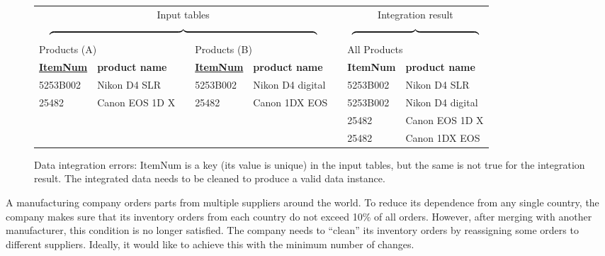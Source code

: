 \begin{figure}
	\small{\begin{tabular}{|l|l|l|l|l|l|l|l|}
		\multicolumn{5}{c}{Input tables} & \multicolumn{1}{l}{}& \multicolumn{2}{c}{Integration result}\\
		\multicolumn{5}{c}{$\overbrace{\rule{9.5cm}{0pt}}$} & \multicolumn{1}{l}{}& \multicolumn{2}{c}{$\overbrace{\rule{4.5cm}{0pt}}$}\\
		\multicolumn{2}{l}{Products (A)} & \multicolumn{1}{l}{} & \multicolumn{2}{l}{Products (B)} & \multicolumn{1}{l}{} & \multicolumn{2}{l}{All Products}\\
		\cline{1-2}\cline{4-5}\cline{7-8}
		\textbf{\underline{ItemNum}} & \textbf{product name} & \multicolumn{1}{l|}{} & \textbf{\underline{ItemNum}} & \textbf{product name} & \multicolumn{1}{l|}{} & \textbf{ItemNum} & \textbf{product name}\\
		\cline{1-2}\cline{4-5}\cline{7-8}
		5253B002 & Nikon D4 SLR & \multicolumn{1}{l|}{} & 5253B002 & Nikon D4 digital & \multicolumn{1}{l|}{} & 5253B002 & Nikon D4 SLR\\
		\cline{1-2}\cline{4-5}\cline{7-8}
		25482 & Canon EOS 1D X & \multicolumn{1}{l|}{} & 25482 & Canon 1DX EOS & \multicolumn{1}{l|}{} & 5253B002 & Nikon D4 digital\\
		\cline{1-2}\cline{4-5}\cline{7-8}
		\multicolumn{6}{l|}{} & 25482 & Canon EOS 1D X\\
		\cline{7-8}
		\multicolumn{6}{l|}{} & 25482 & Canon 1DX EOS\\
		\cline{7-8}
		
	\end{tabular}}
	\caption{Data integration errors: ItemNum is a key (its value is unique) in the input tables, but the same is not true for the integration result. The integrated data needs to be cleaned to produce a valid data instance.}\label{fig:integrationExample}
\end{figure}

\begin{example}\label{ex:how-to}
A manufacturing company orders parts from multiple suppliers around
the world. To reduce its dependence from any single country, the
company makes sure that its inventory orders from each country do not
exceed 10\% of all orders. However, after merging with another
manufacturer, this condition is no longer satisfied. The company needs
to ``clean'' its inventory orders by reassigning some orders to
different suppliers. Ideally, it would like to achieve this with the
minimum number of changes.
\end{example}

